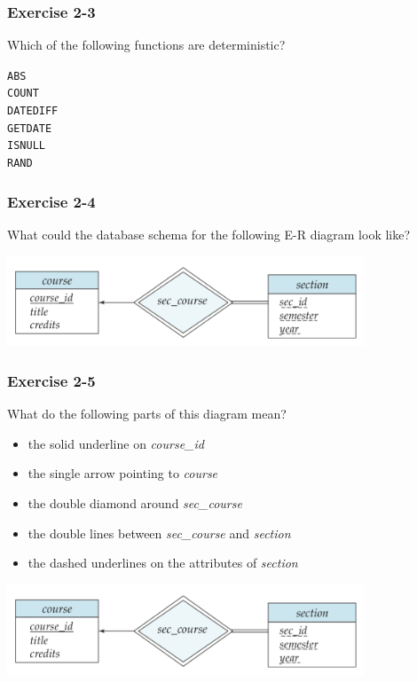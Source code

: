 \begin{frame}
\frametitle{Exercise 2-3}

Which of the following functions are deterministic?

\texttt{ABS} \\
\texttt{COUNT} \\
\texttt{DATEDIFF} \\
\texttt{GETDATE} \\
\texttt{ISNULL} \\
\texttt{RAND} \\

\end{frame}


\begin{frame}
\frametitle{Exercise 2-4}

What could the database schema for the following E-R diagram look like?

\begin{center}
  \includegraphics[width=0.8\textwidth]{images/weak-entity-set}
\end{center}

\end{frame}


\begin{frame}
\frametitle{Exercise 2-5}

What do the following parts of this diagram mean?

\begin{itemize}
  \item the solid underline on \textit{course\_id}
  \item the single arrow pointing to \textit{course}
  \item the double diamond around \textit{sec\_course}
  \item the double lines between \textit{sec\_course} and \textit{section}
  \item the dashed underlines on the attributes of \textit{section}
\end{itemize}

\begin{center}
  \includegraphics[width=0.8\textwidth]{images/weak-entity-set}
\end{center}

\end{frame}


